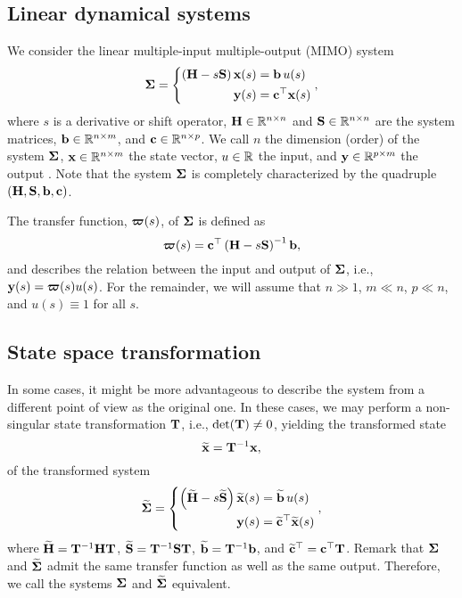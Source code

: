 \subsection{Linear dynamical systems}
\label{lds:mimo}

We consider the linear multiple-input multiple-output (MIMO) system
\begin{equation}
  \mathbf{\Sigma} = \left\{\begin{aligned}
    \left( \mathbf{H} - s\mathbf{S} \right) \mathbf{x}(s) &= \mathbf{b}\,u(s) \\
                              \mathbf{y}(s) &= \mathbf{c}^\top \mathbf{x}(s)
  \end{aligned}\right.,
  \label{eq:siso}
\end{equation}
where $s$ is a derivative or shift operator, $\bH \inRR{n}$ and $\bS \inRR{n}$ are the system matrices, $\bfb \inR[n][m]$, and $\bfc \inR[n][p]$. We call $n$ the dimension  (order) of the system $\mathbf{\Sigma}$, $\bfx \inR[n][m]$ the state vector, $u \inR$ the input, and $\bfy \inR[p][m]$ the output \cite{Antoulas2005}. Note that the system $\mathbf{\Sigma}$ is completely characterized by the quadruple $(\mathbf{H},\mathbf{S},\mathbf{b},\mathbf{c})$.

The transfer function, $\boldsymbol{\varpi}(s)$, of $\mathbf{\Sigma}$ is defined as
\begin{equation}
  \boldsymbol{\varpi}(s) = \mathbf{c}^\top \left( \mathbf{H} - s\mathbf{S} \right)^{-1} \mathbf{b},
  \label{eq:siso-tf}
\end{equation}
and describes the relation between the input and output of $\mathbf{\Sigma}$, i.e., $\mathbf{y}(s) = \boldsymbol{\varpi}(s) u(s)$. For the remainder, we will assume that $n \gg 1$, $m \ll n$, $p \ll n$, and $u(s) \equiv 1$ for all $s$.

\subsection{State space transformation}
\label{lds:ss-transf}

In some cases, it might be more advantageous to describe the system from a different point of view as the original one. In these cases, we may perform a non-singular state transformation $\mathbf{T}$, i.e., $\det(\mathbf{T}) \neq 0$, yielding the transformed state
\begin{equation}
  \widetilde{\mathbf{x}} = \mathbf{T}^{-1} \mathbf{x},
  \label{eq:defxtil}
\end{equation}
of the transformed system
\begin{equation}
  \widetilde{\mathbf{\Sigma}} = \left\{\begin{aligned}
    \left( \widetilde{\mathbf{H}} - s\widetilde{\mathbf{S}} \right) \widetilde{\mathbf{x}}(s) &= \widetilde{\mathbf{b}}\,u(s) \\
                                 \mathbf{y}(s) &= \widetilde{\mathbf{c}}^\top \widetilde{\mathbf{x}}(s)
  \end{aligned}\right.,
\end{equation}
where $\widetilde{\mathbf{H}} = \mathbf{T}^{-1} \mathbf{H} \mathbf{T}$, $\widetilde{\mathbf{S}} = \mathbf{T}^{-1} \mathbf{S} \mathbf{T}$, $\widetilde{\mathbf{b}} = \mathbf{T}^{-1} \mathbf{b}$, and $\widetilde{\mathbf{c}}^\top = \mathbf{c}^\top \mathbf{T}$. Remark that $\mathbf{\Sigma}$ and $\widetilde{\mathbf{\Sigma}}$ admit the same transfer function as well as the same output. Therefore, we call the systems $\mathbf{\Sigma}$ and $\widetilde{\mathbf{\Sigma}}$ equivalent.

